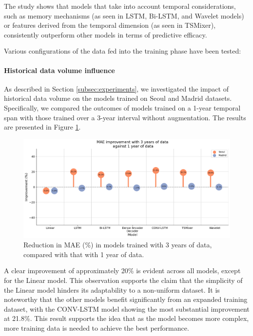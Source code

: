 The study shows that models that take into account temporal considerations, such as memory mechanisms (as seen in LSTM, Bi-LSTM, and Wavelet models) or features derived from the temporal dimension (as seen in TSMixer), consistently outperform other models in terms of predictive efficacy.

Various configurations of the data fed into the training phase have been tested:

\paragraph{Historical data volume influence}

As described in Section \ref{subsec:experiments}, we investigated the impact of historical data volume on the models trained on Seoul and Madrid datasets. Specifically, we compared the outcomes of models trained on a 1-year temporal span with those trained over a 3-year interval without augmentation. The results are presented in Figure \ref{fig:more_data_improv}.

\begin{figure}[h]
    \centering
    \includegraphics[width=1\linewidth]{images/Results/improvement with more data.png}
    \caption{Reduction in MAE (\%) in models trained with 3 years of data, compared with that with 1 year of data.}
    \label{fig:more_data_improv}
\end{figure}

A clear improvement of approximately 20\% is evident across all models, except for the Linear model. This observation supports the claim that the simplicity of the Linear model hinders its adaptability to a non-uniform dataset. It is noteworthy that the other models benefit significantly from an expanded training dataset, with the CONV-LSTM model showing the most substantial improvement at 21.8\%. This result supports the idea that as the model becomes more complex, more training data is needed to achieve the best performance.

